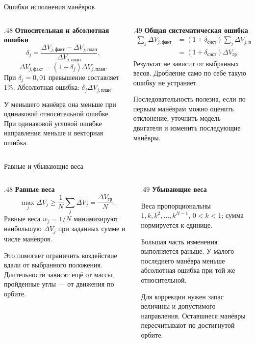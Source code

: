 \documentclass[11pt,aspectratio=169,t]{beamer}
\newcommand{\eqcompact}{\fontsize{10}{12}\selectfont}
\newcommand{\derivationmathspacing}{%
  \setlength{\abovedisplayskip}{2pt}%
  \setlength{\belowdisplayskip}{3pt}%
  \setlength{\abovedisplayshortskip}{2pt}%
  \setlength{\belowdisplayshortskip}{2pt}%
  \setlength{\jot}{2pt}}
\begin{document}
\begin{frame}{Ошибки исполнения манёвров}
\relax\derivationmathspacing
\begin{columns}[T,onlytextwidth]
\begin{column}{.48\textwidth}
\textbf{Относительная и абсолютная ошибки}
{\eqcompact\derivationmathspacing
\[
 \delta_j=
 \frac{\Delta V_{j,\text{факт}}-\Delta V_{j,\text{план}}}
      {\Delta V_{j,\text{план}}},
\]
\[
 \Delta V_{j,\text{факт}}=(1+\delta_j)\Delta V_{j,\text{план}}.
\]
}
При $\delta_j=0{,}01$ превышение составляет $1\%$.
Абсолютная ошибка: $\delta_j\Delta V_{j,\text{план}}$.
\par\smallskip
У меньшего манёвра она меньше при одинаковой относительной ошибке.
При одинаковой угловой ошибке направления меньше и векторная ошибка.
\end{column}
\begin{column}{.49\textwidth}
\textbf{Общая систематическая ошибка}
{\eqcompact\derivationmathspacing
\[
 \begin{aligned}
 \sum_j\Delta V_{j,\text{факт}}
 &=(1+\delta_{\text{сист}})
      \sum_j\Delta V_{j,\text{план}}\\
 &=(1+\delta_{\text{сист}})\Delta V_{\text{гр}}.
 \end{aligned}
\]
}
Результат не зависит от выбранных весов.
Дробление само по себе такую ошибку не устраняет.
\par\smallskip
Последовательность полезна, если по первым манёврам можно оценить
отклонение, уточнить модель двигателя и изменить последующие манёвры.
\end{column}
\end{columns}
\end{frame}

\begin{frame}{Равные и убывающие веса}
\relax\derivationmathspacing
\begin{columns}[T,onlytextwidth]
\begin{column}{.48\textwidth}
\textbf{Равные веса}
{\eqcompact\derivationmathspacing
\[
 \max_j\Delta V_j\geqslant
 \frac1N\sum_j\Delta V_j=\frac{\Delta V_{\text{гр}}}{N}.
\]
}
Равные веса $w_j=1/N$ минимизируют наибольшую $\Delta V_j$
при заданных сумме и числе манёвров.
\par\smallskip
Это помогает ограничить воздействие вдали от выбранного положения.
Длительности зависят ещё от массы, пройденные углы --- от движения по орбите.
\end{column}
\begin{column}{.49\textwidth}
\textbf{Убывающие веса}
\par\smallskip
Веса пропорциональны $1,k,k^2,\ldots,k^{N-1}$,
$0<k<1$; сумма нормируется к единице.
\par\smallskip
Большая часть изменения выполняется раньше.
У малого последнего манёвра меньше абсолютная ошибка
при той же относительной.
\par\smallskip
Для коррекции нужен запас величины и допустимого направления.
Оставшиеся манёвры пересчитывают по достигнутой орбите.
\end{column}
\end{columns}
\end{frame}
\end{document}
